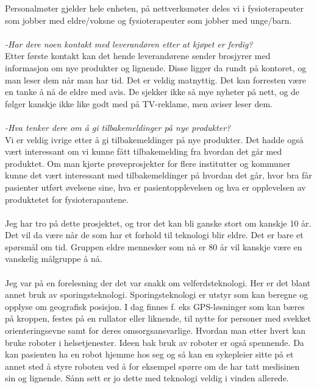 Personalmøter gjelder hele enheten, på nettverksmøter deles vi i fysioterapeuter som jobber med eldre/voksne og fysioterapeuter som jobber med unge/barn. \\ \\
\emph{-Har dere noen kontakt med leverandøren etter at kjøpet er ferdig?}\\
Etter første kontakt kan det hende leverandørene sender brosjyrer med informasjon om nye produkter og lignende. Disse ligger da rundt på kontoret, og man leser dem når man har tid. Det er veldig matnyttig. Det kan forresten være en tanke å nå de eldre med avis. De sjekker ikke så mye nyheter på nett, og de følger kanskje ikke like godt med på TV-reklame, men aviser leser dem. \\ \\
\emph{-Hva tenker dere om å gi tilbakemeldinger på nye produkter?}\\
Vi er veldig ivrige etter å gi tilbakemeldinger på nye produkter. Det hadde også vært interessant om vi kunne fått tilbakemelding fra hvordan det går med produktet. Om man kjørte prøveprosjekter for flere institutter og kommuner kunne det vært interessant med tilbakemeldinger på hvordan det går, hvor bra får pasienter utført øvelsene sine, hva er pasientopplevelsen og hva er opplevelsen av produktetet for fysioterapautene. \\ \\
Jeg har tro på dette prosjektet, og tror det kan bli ganske stort om kanskje 10 år. Det vil da være når de som har et forhold til teknologi blir eldre. Det er bare et spørsmål om tid. Gruppen eldre mennesker som nå er 80 år vil kanskje være en vanskelig målgruppe å nå. \\ \\
Jeg var på en forelesning der det var snakk om velferdsteknologi. Her er det blant annet bruk av sporingsteknologi. Sporingsteknologi er utstyr som kan beregne og opplyse om geografisk posisjon. I dag finnes f. eks GPS-løsninger som kan bæres på kroppen, festes på en rullator eller liknende, til nytte for personer med svekket orienteringsevne samt for deres omsorgsansvarlige. Hvordan man etter hvert kan bruke roboter i helsetjenester. Ideen bak bruk av roboter er også spennende. Da kan pasienten ha en robot hjemme hos seg og så kan en sykepleier sitte på et annet sted å styre roboten ved å for eksempel spørre om de har tatt medisinen sin og lignende. Sånn sett er jo dette med teknologi veldig i vinden allerede.\\ \\
